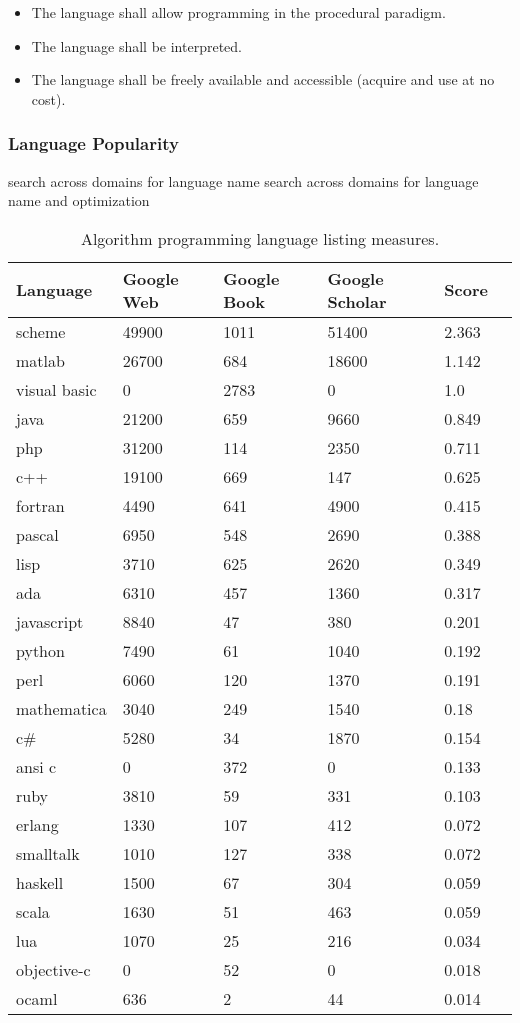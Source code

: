 \documentclass[a4paper, 11pt]{article}
\begin{document}
\begin{itemize}
	\item The language shall allow programming in the procedural paradigm.
	\item The language shall be interpreted.
	\item The language shall be freely available and accessible (acquire and use at no cost).
\end{itemize}

\subsubsection{Language Popularity}
\label{subsubsec:popularity}
search across domains for language name
search across domains for language name and optimization

\begin{table}[ht]
	\centering
		\begin{tabularx}{\textwidth}{llXXXX}
		\toprule
		\textbf{Language} & \textbf{Google Web} & \textbf{Google Book} & \textbf{Google Scholar} & \textbf{Score} \\ 
		\toprule
		scheme & 49900 & 1011 & 51400 & 2.363 \\
		matlab & 26700 & 684 & 18600 & 1.142 \\
		visual basic & 0 & 2783 & 0 & 1.0 \\
		java & 21200 & 659 & 9660 & 0.849 \\
		php & 31200 & 114 & 2350 & 0.711 \\
		c++ & 19100 & 669 & 147 & 0.625 \\
		fortran & 4490 & 641 & 4900 & 0.415 \\
		pascal & 6950 & 548 & 2690 & 0.388 \\
		lisp & 3710 & 625 & 2620 & 0.349 \\
		ada & 6310 & 457 & 1360 & 0.317 \\
		javascript & 8840 & 47 & 380 & 0.201 \\
		python & 7490 & 61 & 1040 & 0.192 \\
		perl & 6060 & 120 & 1370 & 0.191 \\
		mathematica & 3040 & 249 & 1540 & 0.18 \\
		c# & 5280 & 34 & 1870 & 0.154 \\
		ansi c & 0 & 372 & 0 & 0.133 \\
		ruby & 3810 & 59 & 331 & 0.103 \\
		erlang & 1330 & 107 & 412 & 0.072 \\
		smalltalk & 1010 & 127 & 338 & 0.072 \\
		haskell & 1500 & 67 & 304 & 0.059 \\
		scala & 1630 & 51 & 463 & 0.059 \\
		lua & 1070 & 25 & 216 & 0.034 \\
		objective-c & 0 & 52 & 0 & 0.018 \\
		ocaml & 636 & 2 & 44 & 0.014 \\
		\bottomrule
		\end{tabularx}	
	\caption{Algorithm programming language listing measures.}
	\label{tab:results}
\end{table}
\end{document}

